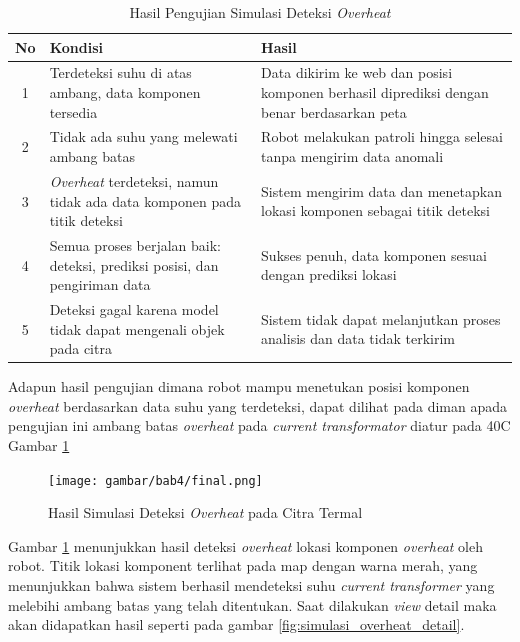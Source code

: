 \begin{table}[H]
    \centering
    \caption{Hasil Pengujian Simulasi Deteksi \emph{Overheat}}
    \label{tab:simulasi_overheat}
    \begin{tabular}{|c|p{6cm}|p{5.5cm}|}
    \hline
    \textbf{No} & \textbf{Kondisi} & \textbf{Hasil} \\ \hline
    1 & Terdeteksi suhu di atas ambang, data komponen tersedia & Data dikirim ke web dan posisi komponen berhasil diprediksi dengan benar berdasarkan peta \\ \hline
    2 & Tidak ada suhu yang melewati ambang batas & Robot melakukan patroli hingga selesai tanpa mengirim data anomali \\ \hline
    3 & \emph{Overheat} terdeteksi, namun tidak ada data komponen pada titik deteksi & Sistem mengirim data dan menetapkan lokasi komponen sebagai titik deteksi \\ \hline
    4 & Semua proses berjalan baik: deteksi, prediksi posisi, dan pengiriman data & Sukses penuh, data komponen sesuai dengan prediksi lokasi \\ \hline
    5 & Deteksi gagal karena model tidak dapat mengenali objek pada citra & Sistem tidak dapat melanjutkan proses analisis dan data tidak terkirim \\ \hline
    \end{tabular}
    \end{table}

    Adapun hasil pengujian dimana robot mampu menetukan posisi komponen \emph{overheat}  berdasarkan data suhu yang terdeteksi, dapat dilihat pada diman apada pengujian ini ambang batas \emph{overheat} pada \emph{current transformator} diatur pada 40\textdegree{}C Gambar \ref{fig:simulasi_overheat}

    \begin{figure}[H]
    \centering
    \texttt{[image: gambar/bab4/final.png]}
    \caption{Hasil Simulasi Deteksi \emph{Overheat} pada Citra Termal}
    \label{fig:simulasi_overheat}
    \end{figure}

	Gambar \ref{fig:simulasi_overheat} menunjukkan hasil  deteksi \emph{overheat} lokasi komponen \emph{overheat} oleh robot. Titik lokasi komponent terlihat pada map dengan warna merah, yang menunjukkan bahwa sistem berhasil mendeteksi suhu \emph{current transformer} yang melebihi ambang batas yang telah ditentukan. Saat dilakukan \emph{view} detail maka
	akan didapatkan hasil seperti pada gambar \ref{fig:simulasi_overheat_detail}.

